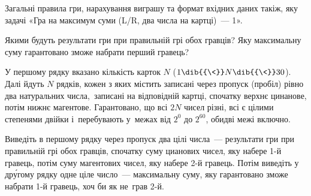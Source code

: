 
Загальні правила гри, нарахування виграшу та формат вхідних даних 
такі\nolinebreak[3] ж, як\nolinebreak[2] у\nolinebreak[3]
задачі «Гра на максимум суми (L/R, два числа на картці)~— 1».

Якими будуть результати гри при правильній грі обох гравців?
Яку максимальну суму гарантовано зможе набрати перший гравець?

\InputFile
У першому рядку вказано кількість карток $N$ ($1\dib{{\<}}N\dib{{\<}}30$). Далі йдуть $N$ рядків, кожен з яких містить записані через пропуск (пробіл) рівно два натуральних числа, записані на відповідній картці, спочатку верхнє цинанове, потім нижнє магентове. Гарантовано, що всі $2N$ чисел різні, всі є цілими степенями двійки і~перебувають у~межах від $2^0$ до $2^{60}$, обидві межі включно.


\OutputFile
Виведіть в першому рядку через пропуск два цілі числа~--- результати гри при правильній грі обох гравців, спочатку суму цианових чисел, яку набере \mbox{1-й} гравець, потім суму магентових чисел, яку набере \mbox{2-й} гравець.
Потім виведіть у др\'{у}гому рядку одне ціле число~--- максимальну суму, яку гарантовано зможе набрати \mbox{1-й} гравець, хоч би як не~грав \mbox{2-й}.

\Examples

\begin{exampleSimple}{5em}{6.5em}
%
%
%
\end{exampleSimple}

